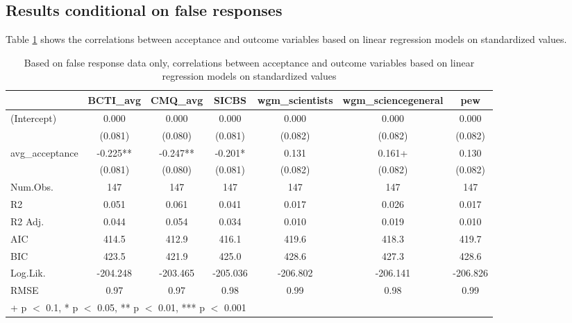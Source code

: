 \documentclass[
  doc,floatsintext]{apa6}
\begin{document}
\subsection{Results conditional on false responses}\label{results-conditional-on-false-responses-1}

Table \ref{tab:exp2-false-response-regression} shows the correlations between acceptance and outcome variables based on linear regression models on standardized values.

\begin{table}

\caption{\label{tab:exp2-false-response-regression}Based on false response data only, correlations between acceptance and outcome variables based on linear regression models on standardized values}
\centering
\begin{tabular}[t]{lcccccc}
\toprule
  & BCTI\_avg & CMQ\_avg & SICBS & wgm\_scientists & wgm\_sciencegeneral & pew\\
\midrule
(Intercept) & 0.000 & 0.000 & 0.000 & 0.000 & 0.000 & 0.000\\
 & (0.081) & (0.080) & (0.081) & (0.082) & (0.082) & \vphantom{1} (0.082)\\
avg\_acceptance & -0.225** & -0.247** & -0.201* & 0.131 & 0.161+ & 0.130\\
 & (0.081) & (0.080) & (0.081) & (0.082) & (0.082) & (0.082)\\
\midrule
Num.Obs. & 147 & 147 & 147 & 147 & 147 & 147\\
R2 & 0.051 & 0.061 & 0.041 & 0.017 & 0.026 & 0.017\\
R2 Adj. & 0.044 & 0.054 & 0.034 & 0.010 & 0.019 & 0.010\\
AIC & 414.5 & 412.9 & 416.1 & 419.6 & 418.3 & 419.7\\
BIC & 423.5 & 421.9 & 425.0 & 428.6 & 427.3 & 428.6\\
Log.Lik. & -204.248 & -203.465 & -205.036 & -206.802 & -206.141 & -206.826\\
RMSE & 0.97 & 0.97 & 0.98 & 0.99 & 0.98 & 0.99\\
\bottomrule
\multicolumn{7}{l}{\rule{0pt}{1em}+ p $<$ 0.1, * p $<$ 0.05, ** p $<$ 0.01, *** p $<$ 0.001}\\
\end{tabular}
\end{table}
\end{document}
